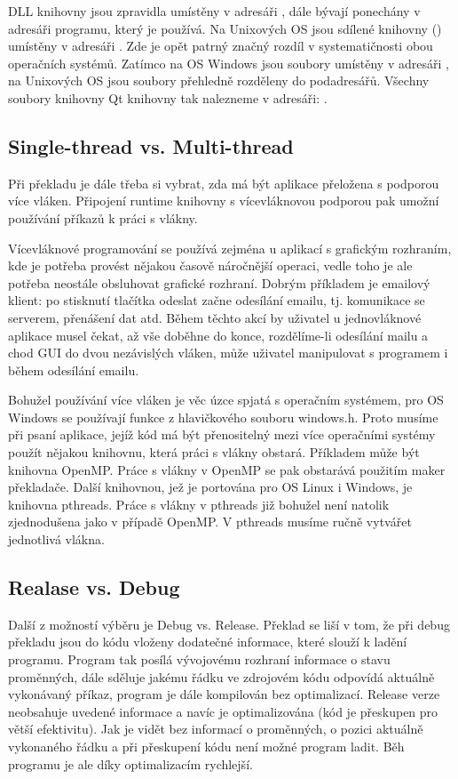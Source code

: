 DLL knihovny jsou zpravidla umístěny v adresáři , dále bývají ponechány v adresáři programu, který je používá. Na Unixových OS jsou sdílené knihovny () umístěny v adresáři . Zde je opět patrný značný rozdíl v systematičnosti obou operačních systémů. Zatímco na OS Windows jsou  soubory umístěny v adresáři , na Unixových OS jsou  soubory přehledně rozděleny do podadresářů. Všechny  soubory knihovny Qt knihovny tak nalezneme v adresáři: .

\subsection{Single-thread vs. Multi-thread}
Při překladu je dále třeba si vybrat, zda má být aplikace přeložena s podporou více vláken. Připojení runtime knihovny s vícevláknovou podporou pak umožní používání příkazů k práci s vlákny.

Vícevláknové programování se používá zejména u aplikací s grafickým rozhraním, kde je potřeba provést nějakou časově náročnější operaci, vedle toho je ale potřeba neostále obsluhovat grafické rozhraní. Dobrým příkladem je emailový klient: po stisknutí tlačítka odeslat začne odesílání emailu, tj. komunikace se serverem, přenášení dat atd. Během těchto akcí by uživatel u jednovláknové aplikace musel čekat, až vše doběhne do konce, rozdělíme-li odesílání mailu a chod GUI do dvou nezávislých vláken, může uživatel manipulovat s programem i během odesílání emailu.

Bohužel používání více vláken je věc úzce spjatá s operačním systémem, pro OS Windows se používají funkce z hlavičkového souboru windows.h. Proto musíme při psaní aplikace, jejíž kód má být přenositelný mezi více operačními systémy použít nějakou knihovnu, která práci s vlákny obstará. Příkladem může být knihovna OpenMP. Práce s vlákny v OpenMP se pak obstarává použitím maker překladače. Další knihovnou, jež je portována pro OS Linux i Windows, je knihovna pthreads. Práce s vlákny v pthreads již bohužel není natolik zjednodušena jako v případě OpenMP. V pthreads musíme ručně vytvářet jednotlivá vlákna.

\subsection{Realase vs. Debug}
\label{releasedebug}
Další z možností výběru je Debug vs. Release. Překlad se liší v tom, že při debug překladu jsou do kódu vloženy dodatečné informace, které slouží k ladění programu. Program tak posílá vývojovému rozhraní informace o stavu proměnných, dále sděluje jakému řádku ve zdrojovém kódu odpovídá aktuálně vykonávaný příkaz, program je dále kompilován bez optimalizací. Release verze neobsahuje uvedené informace a navíc je optimalizována (kód je přeskupen pro větší efektivitu). Jak je vidět bez informací o proměnných, o pozici aktuálně vykonaného řádku a při přeskupení kódu není možné program ladit. Běh programu je ale díky optimalizacím rychlejší.


